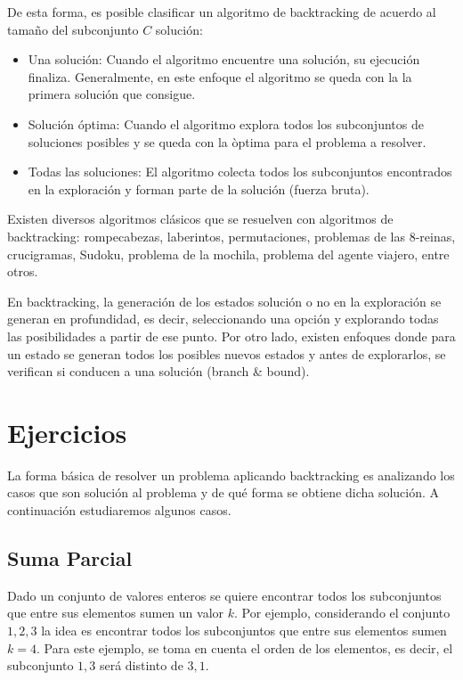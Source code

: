 De esta forma, es posible clasificar un algoritmo de backtracking de acuerdo al tamaño del subconjunto $C$ solución:
\begin{itemize}
\item Una solución: Cuando el algoritmo encuentre una solución, su ejecución finaliza. Generalmente, en este enfoque el algoritmo se queda con la la primera solución que consigue.
\item Solución óptima: Cuando el algoritmo explora todos los subconjuntos de soluciones posibles y se queda con la òptima para el problema a resolver.
\item Todas las soluciones: El algoritmo colecta todos los subconjuntos encontrados en la exploración y forman parte de la solución (fuerza bruta).
\end{itemize}

Existen diversos algoritmos clásicos que se resuelven con algoritmos de backtracking: rompecabezas, laberintos, permutaciones, problemas de las 8-reinas, crucigramas, Sudoku, problema de la mochila, problema del agente viajero, entre otros. 

En backtracking, la generación de los estados solución o no en la exploración se generan en profundidad, es decir, seleccionando una opción y explorando todas las posibilidades a partir de ese punto. Por otro lado, existen enfoques donde para un estado se generan todos los posibles nuevos estados y antes de explorarlos, se verifican si conducen a una solución (branch \& bound).

\section{Ejercicios}

La forma básica de resolver un problema aplicando backtracking es analizando los casos que son solución al problema y de qué forma se obtiene dicha solución. A continuación estudiaremos algunos casos.

\subsection{Suma Parcial}
Dado un conjunto de valores enteros se quiere encontrar todos los subconjuntos que entre sus elementos sumen un valor $k$. Por ejemplo, considerando el conjunto ${1, 2, 3}$ la idea es encontrar todos los subconjuntos que entre sus elementos sumen $k=4$. Para este ejemplo, se toma en cuenta el orden de los elementos, es decir, el subconjunto ${1, 3}$ será distinto de ${3, 1}$.


